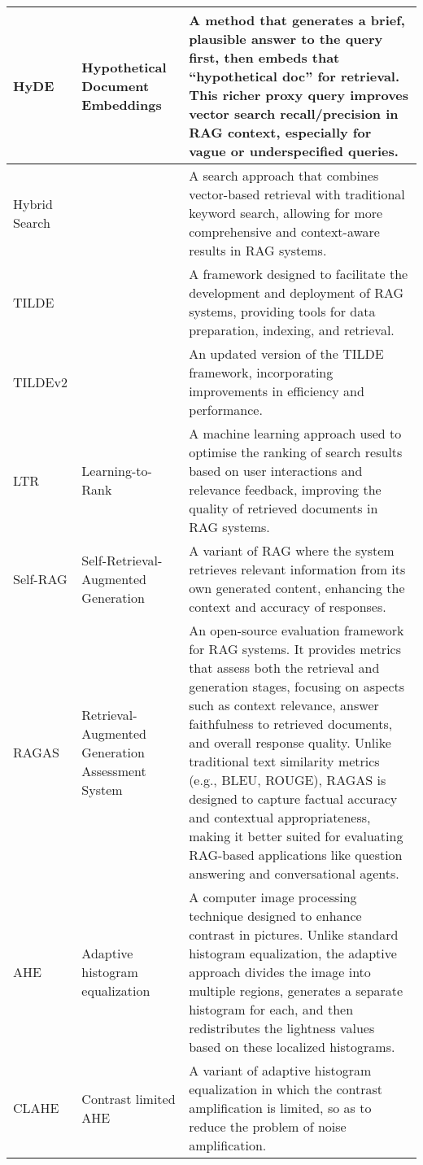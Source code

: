 \begin{tabularx}{\textwidth}{
  >{\raggedright\arraybackslash}p{2.5cm}
  >{\raggedright\arraybackslash}p{4cm}
  >{\noindent\justifying\arraybackslash}X
}
\cmidrule(lr){1-3}
HyDE  & Hypothetical Document Embeddings & A method that generates a brief, plausible answer to the query first, then embeds that ``hypothetical doc'' for retrieval. This richer proxy query improves vector search recall/precision in RAG context, especially for vague or underspecified queries. \\
\cmidrule(lr){1-3}
Hybrid Search &  & A search approach that combines vector-based retrieval with traditional keyword search, allowing for more comprehensive and context-aware results in RAG systems. \\
\cmidrule(lr){1-3}
TILDE &  & A framework designed to facilitate the development and deployment of RAG systems, providing tools for data preparation, indexing, and retrieval. \\
\cmidrule(lr){1-3}
TILDEv2 &  & An updated version of the TILDE framework, incorporating improvements in efficiency and performance. \\
\cmidrule(lr){1-3}
LTR   & Learning-to-Rank & A machine learning approach used to optimise the ranking of search results based on user interactions and relevance feedback, improving the quality of retrieved documents in RAG systems. \\
\cmidrule(lr){1-3}
Self-RAG & Self-Retrieval-Augmented Generation & A variant of RAG where the system retrieves relevant information from its own generated content, enhancing the context and accuracy of responses. \\
\cmidrule(lr){1-3}
RAGAS & Retrieval-Augmented Generation Assessment System & An open-source evaluation framework for RAG systems. It provides metrics that assess both the retrieval and generation stages, focusing on aspects such as context relevance, answer faithfulness to retrieved documents, and overall response quality. Unlike traditional text similarity metrics (e.g., BLEU, ROUGE), RAGAS is designed to capture factual accuracy and contextual appropriateness, making it better suited for evaluating RAG-based applications like question answering and conversational agents. \\
\cmidrule(lr){1-3}
AHE & Adaptive histogram equalization & A computer image processing technique designed to enhance contrast in pictures. Unlike standard histogram equalization, the adaptive approach divides the image into multiple regions, generates a separate histogram for each, and then redistributes the lightness values based on these localized histograms. \\
\cmidrule(lr){1-3}
CLAHE & Contrast limited AHE & A variant of adaptive histogram equalization in which the contrast amplification is limited, so as to reduce the problem of noise amplification. \\

\end{tabularx}
